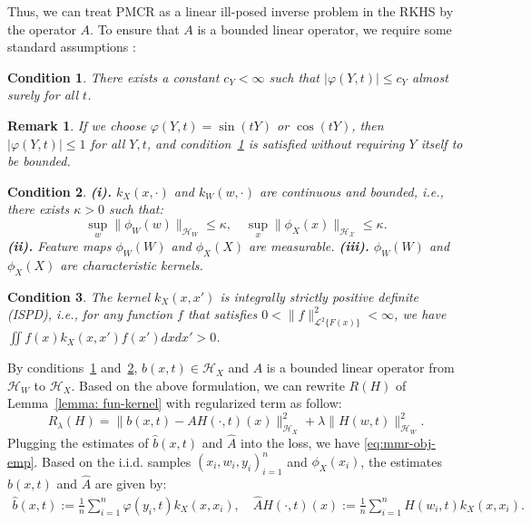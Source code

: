 \documentclass[
  12pt]{article}
\newtheorem{assumption}{Condition}
\newtheorem{remark}{Remark}
\def\wh{\widehat}
\def\cL{\mathcal{L}}
\begin{document}
Thus, we can treat PMCR as a linear ill-posed inverse problem in the RKHS by the operator $A$. To ensure that $A$ is a bounded linear operator, we require some standard assumptions \citep{zhang2020maximum,mastouri2021proximal}:
\begin{assumption}\label{ass:y_bounded}
There exists a constant $c_Y<\infty$ such that $|\varphi(Y,t)|\le c_Y$ almost surely for all $t$.
\end{assumption} 
\begin{remark}
    If we choose $\varphi(Y,t)=\sin(tY)$ or $\cos(tY)$, then $|\varphi(Y,t)|\le 1$ for all $Y,t$, and condition~\ref{ass:y_bounded} is satisfied without requiring $Y$ itself to be bounded.
\end{remark}
\begin{assumption}\label{ass:kernel_characteristic}
\textbf{(i).} $k_X(x,\cdot)$ and $k_W(w,\cdot)$ are continuous and bounded, \emph{i.e.}, there exists $\kappa>0$ such that:
$$
\sup\limits_{w}\|\phi_W (w) \|_{\mathcal{H}_W}\le \kappa ,\quad\sup\limits_{x}\|\phi_X (x)\|_{\mathcal{H}_{\mathcal{X}}}\le \kappa.
$$
\textbf{(ii).} Feature maps $\phi_W(W)$ and $\phi_X(X)$ are measurable.
\textbf{(iii).} $\phi_W(W)$ and $\phi_X(X)$ are characteristic kernels. 
\end{assumption}
\begin{assumption}\label{assum.ISPD kernel} 
The kernel $k_X(x,x')$ is integrally strictly positive definite (ISPD), \emph{i.e.}, for any function $f$ that satisfies $0<\|f\|_{\cL^2\{F(x)\}}^2<\infty$, we have $\iint f(x)k_X(x,x')f(x')dxdx'>0$.
\end{assumption}

By conditions~\ref{ass:y_bounded} and~\ref{ass:kernel_characteristic}, $b(x,t)\in\mathcal{H}_X$ and $A$ is a bounded linear operator from $\mathcal{H}_{W}$ to $\mathcal{H}_{X}$. Based on the above formulation, we can rewrite $R(H)$ of Lemma~\ref{lemma: fun-kernel} with regularized term as follow:
\begin{equation}\label{eq:mmr-obj}
    R_{\lambda}(H)=\| b(x,t)-AH(\cdot,t)(x)\|_{\mathcal{H}_X}^{2}+\lambda \| H(w,t)\|_{\mathcal{H}_W}^{2}.
\end{equation}
Plugging the estimates of $\wh{b}(x,t)$ and $\wh{A}$ into the loss, we have \eqref{eq:mmr-obj-emp}. Based on the i.i.d. samples $(x_i,w_i,y_i)_{i=1}^n$ and $\phi_X(x_i)$, the estimates $\widehat{b}(x,t)$ and $\widehat{A}$ are given by:
\begin{align}
\label{eq.estimate_f_K}
    \widehat{b}(x,t):=\frac{1}{n}\sum_{i=1}^n{\varphi(y_i,t) k_X(x,x_i)}, \quad
    \widehat{A}H(\cdot,t)(x):=\frac{1}{n}\sum_{i=1}^n{H(w_i,t) k_X(x,x_i)}.
\end{align}
\end{document}
